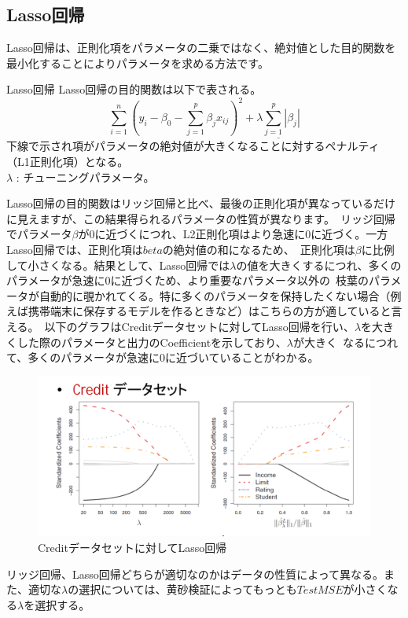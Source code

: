 \documentclass[uplatex]{jsarticle}
\begin{document}
\subsection{Lasso回帰}
Lasso回帰は、正則化項をパラメータの二乗ではなく、絶対値とした目的関数を最小化することによりパラメータを求める方法です。
\begin{itembox}[l]{Lasso回帰}
  Lasso回帰の目的関数は以下で表される。
  $$\sum_{i=1}^n \left(y_i - \beta_0 - \sum_{j=1}^p \beta_jx_{ij}\right)^2 + \underline{\lambda \sum_{j=1}^p |\beta_j|}$$
下線で示され項がパラメータの絶対値が大きくなることに対するペナルティ（L1正則化項）となる。\\
$\lambda$ : チューニングパラメータ。
\end{itembox}
Lasso回帰の目的関数はリッジ回帰と比べ、最後の正則化項が異なっているだけに見えますが、この結果得られるパラメータの性質が異なります。\
リッジ回帰でパラメータ$\beta$が0に近づくにつれ、L2正則化項はより急速に0に近づく。一方Lasso回帰では、正則化項は$beta$の絶対値の和になるため、\
正則化項は$\beta$に比例して小さくなる。結果として、Lasso回帰では$\lambda$の値を大きくするにつれ、多くのパラメータが急速に0に近づくため、より重要なパラメータ以外の\
枝葉のパラメータが自動的に覗かれてくる。特に多くのパラメータを保持したくない場合（例えば携帯端末に保存するモデルを作るときなど）はこちらの方が適していると言える。\
以下のグラフはCreditデータセットに対してLasso回帰を行い、$\lambda$を大きくした際のパラメータと出力のCoefficientを示しており、$ \lambda$が大きく\
なるにつれて、多くのパラメータが急速に0に近づいていることがわかる。
\begin{figure}
  \begin{center}
    \includegraphics[width=13cm]{img/lasso_lmd.png}
    \caption{Creditデータセットに対してLasso回帰}
  \end{center}
\end{figure}

リッジ回帰、Lasso回帰どちらが適切なのかはデータの性質によって異なる。また、適切な$\lambda$の選択については、黄砂検証によってもっとも$Test MSE$が小さくなる$\lambda$を選択する。
\end{document}
